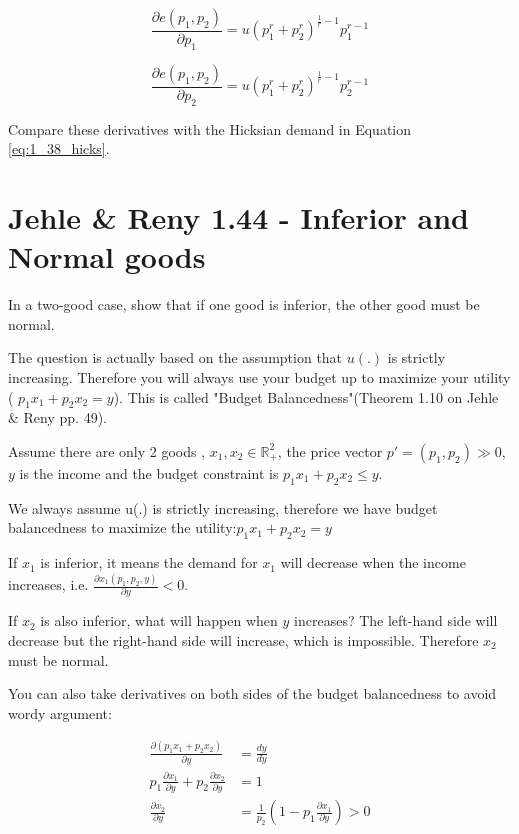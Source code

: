 \documentclass{article}
\newcommand{\R}{\mathbb{R}}
\begin{document}
$$\frac{\partial e(p_1,p_2)}{\partial p_1} =
u (p_1^{r} + p_2^{r})^{\frac{1}{r} - 1} p_1^{r-1}$$

$$\frac{\partial e(p_1,p_2)}{\partial p_2} = 
u (p_1^{r} + p_2^{r})^{\frac{1}{r} - 1} p_2^{r-1}$$

Compare these derivatives with the Hicksian demand in Equation \ref{eq:1_38_hicks}.


\section{Jehle \& Reny 1.44 - Inferior and Normal goods}
In a two-good case, show that if one good is inferior, the other good must be normal.

\begin{mdframed}[backgroundcolor=blue!20,linecolor=white]
The question is actually based on the assumption that $u(.)$ is strictly increasing. Therefore you will always use your budget up to maximize your utility ( $p_1x_1 + p_2x_2 = y$). This is called "Budget Balancedness"(Theorem 1.10 on Jehle \& Reny pp. 49).

\end{mdframed}

Assume there are only 2 goods , $x_1, x_2 \in \R^2_+$, the price vector
$p' = (p_1,p_2) \gg 0$, $y$ is the income and the budget constraint is $p_1x_1 + p_2x_2 \le y$.

We always assume u(.) is strictly increasing, therefore we have budget balancedness to maximize the utility:$p_1x_1 + p_2x_2 = y$

If $x_1$ is inferior, it means the demand for $x_1$ will decrease when the income increases, i.e. $\frac{\partial x_1(p_1,p_2,y)}{\partial y} < 0$.

If $x_2$ is also inferior, what will happen when $y$ increases? The left-hand side will decrease but the right-hand side will increase, which is impossible. Therefore  $x_2$ must be normal.

\begin{mdframed}[backgroundcolor=blue!20,linecolor=white]
You can also take derivatives on both sides of the budget balancedness to avoid wordy argument:

\begin{align*}
\frac{\partial (p_1x_1 + p_2x_2)}{\partial y} &= \frac{dy}{dy} \\
p_1\frac{\partial x_1}{\partial y} + p_2\frac{\partial x_2}{\partial y} &= 1 \\
\frac{\partial x_2}{\partial y} &= \frac{1}{p_2}
(1- p_1\frac{\partial x_1}{\partial y}) >0 \\
\end{align*}
\end{mdframed}
\end{document}
